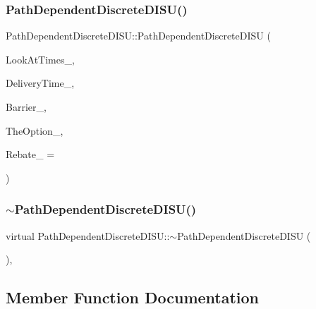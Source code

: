 \subsubsection{\texorpdfstring{Path\+Dependent\+Discrete\+D\+I\+S\+U()}{PathDependentDiscreteDISU()}}
{\footnotesize\ttfamily Path\+Dependent\+Discrete\+D\+I\+S\+U\+::\+Path\+Dependent\+Discrete\+D\+I\+SU (\begin{DoxyParamCaption}\item[{const \hyperlink{classMJArray}{M\+J\+Array} \&}]{Look\+At\+Times\+\_\+,  }\item[{double}]{Delivery\+Time\+\_\+,  }\item[{double}]{Barrier\+\_\+,  }\item[{std\+::shared\+\_\+ptr$<$ \hyperlink{classMyOption_1_1Option}{My\+Option\+::\+Option} $>$}]{The\+Option\+\_\+,  }\item[{double}]{Rebate\+\_\+ = {} }\end{DoxyParamCaption})}

\hypertarget{classPathDependentDiscreteDISU_a57c5a31b75c99336d91faf9da92de5be}{}\label{classPathDependentDiscreteDISU_a57c5a31b75c99336d91faf9da92de5be} 
\subsubsection{\texorpdfstring{$\sim$\+Path\+Dependent\+Discrete\+D\+I\+S\+U()}{~PathDependentDiscreteDISU()}}
{\footnotesize\ttfamily virtual Path\+Dependent\+Discrete\+D\+I\+S\+U\+::$\sim$\+Path\+Dependent\+Discrete\+D\+I\+SU (\begin{DoxyParamCaption}{ }\end{DoxyParamCaption})\hspace{0.3cm}{\ttfamily [inline]}, {\ttfamily [virtual]}}



\subsection{Member Function Documentation}
\hypertarget{classPathDependentDiscreteDISU_ae2b805e66651705392b95f57acc08fff}{}\label{classPathDependentDiscreteDISU_ae2b805e66651705392b95f57acc08fff} 
